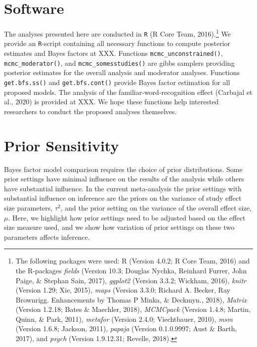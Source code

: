 \documentclass[english,,man]{apa6}
\begin{document}
\hypertarget{software}{%
\section{Software}\label{software}}

The analyses presented here are conducted in \texttt{R} (R Core Team, 2016).\footnote{The following packages were used: R (Version 4.0.2; R Core Team, 2016) and the R-packages \emph{fields} (Version 10.3; Douglas Nychka, Reinhard Furrer, John Paige, \& Stephan Sain, 2017), \emph{ggplot2} (Version 3.3.2; Wickham, 2016), \emph{knitr} (Version 1.29; Xie, 2015), \emph{maps} (Version 3.3.0; Richard A. Becker, Ray Brownrigg. Enhancements by Thomas P Minka, \& Deckmyn., 2018), \emph{Matrix} (Version 1.2.18; Bates \& Maechler, 2018), \emph{MCMCpack} (Version 1.4.8; Martin, Quinn, \& Park, 2011), \emph{metafor} (Version 2.4.0; Viechtbauer, 2010), \emph{msm} (Version 1.6.8; Jackson, 2011), \emph{papaja} (Version 0.1.0.9997; Aust \& Barth, 2017), and \emph{psych} (Version 1.9.12.31; Revelle, 2018).} We provide an \texttt{R}-script containing all necessary functions to compute posterior estimates and Bayes factors at XXX. Functions \texttt{mcmc\_unconstrained()}, \texttt{mcmc\_moderator()}, and \texttt{mcmc\_somesstudies()} are gibbs samplers providing posterior estimates for the overall analysis and moderator analyses. Functions \texttt{get.bfs.ss()} and \texttt{get.bfs.cont()} provide Bayes factor estimation for all proposed models. The analysis of the familiar-word-recognition effect (Carbajal et al., 2020) is provided at XXX. We hope these functions help interested researchers to conduct the proposed analyses themselves.

\hypertarget{prior-sensitivity}{%
\section{Prior Sensitivity}\label{prior-sensitivity}}

Bayes factor model comparison requires the choice of prior distributions. Some prior settings have minimal influence on the results of the analysis while others have substantial influence. In the current meta-analysis the prior settings with substantial influence on inference are the priors on the variance of study effect size parameters, \(\tau^2\), and the prior setting on the variance of the overall effect size, \(\mu\). Here, we highlight how prior settings need to be adjusted based on the effect size measure used, and we show how variation of prior settings on these two parameters affects inference.
\end{document}
